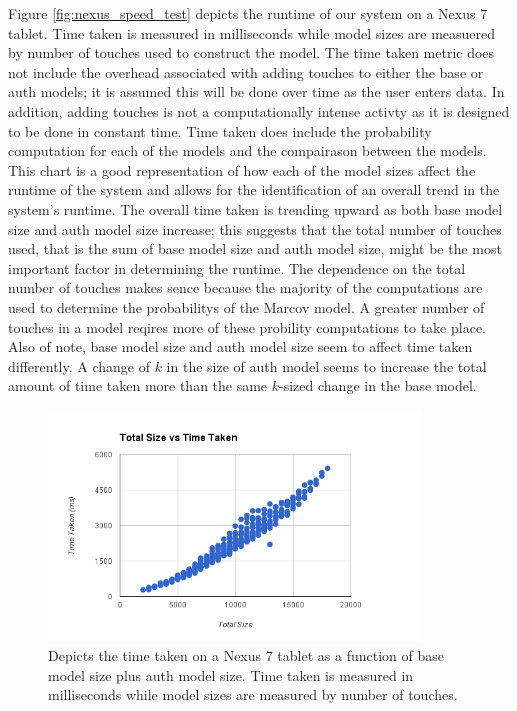 \documentclass{acm_proc_article-sp}
\begin{document}
Figure \ref{fig:nexus_speed_test} depicts the runtime of our system on a Nexus 7 tablet. Time taken is measured in milliseconds while model sizes are measuered by number of touches used to construct the model. 
The time taken metric does not include the overhead associated with adding touches to either the base or auth models; it is assumed this will be done over time as the user enters data. In addition, adding touches is not a computationally intense activty as it is designed to be done in constant time. 
Time taken does include the probability computation for each of the models and the compairason between the models.
This chart is a good representation of how each of the model sizes affect the runtime of the system and allows for the identification of an overall trend in the system's runtime. The overall time taken is trending upward as both base model size and auth model size increase; this suggests that the total number of touches used, that is the sum of base model size and auth model size, might be the most important factor in determining the runtime.
The dependence on the total number of touches makes sence because the majority of the computations are used to determine the probabilitys of the Marcov model. A greater number of touches in a model reqires more of these probility computations to take place.
Also of note, base model size and auth model size seem to affect time taken differently. A change of $k$ in the size of auth model seems to increase the total amount of time taken more than the same $k$-sized change in the base model. 

\begin{figure}
\centering
\includegraphics[width=3.9in]{nexus_total_size_time.png}
\caption{Depicts the time taken on a Nexus 7 tablet as a function of base model size plus auth model size. Time taken is measured in milliseconds while model sizes are measured by number of touches.}
\label{fig:nexus_total_size_time}
\end{figure}
\end{document}
